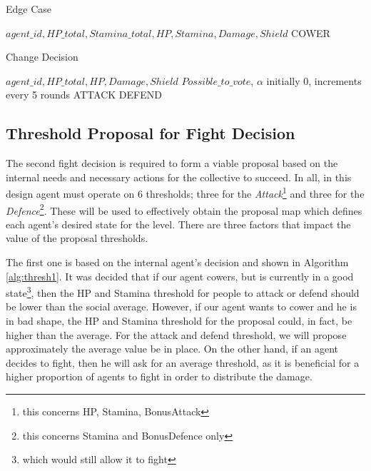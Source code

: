 \begin{algorithm}[htb]
\caption{Edge Case}\label{alg:9}
\begin{algorithmic} 
\scriptsize
\Require $agent\_id, HP\_total,Stamina\_total, HP, Stamina, Damage, Shield$
\Return COWER
\EndIf
\end{algorithmic}
\end{algorithm}

\begin{algorithm}[htb]
\caption{Change Decision}\label{alg:10}
\begin{algorithmic} 
\scriptsize
\Require $agent\_id, HP\_total, HP, Damage, Shield$
\Ensure $Possible\_to\_vote$, $\alpha$ initially 0, increments every 5 rounds
\Return ATTACK
\Return DEFEND
\EndIf
\EndIf
\EndIf
\end{algorithmic}
\end{algorithm}


\subsection{Threshold Proposal for Fight Decision}
    
The second fight decision is required to form a viable proposal based on the internal needs and necessary actions for the collective to succeed. In all, in this design agent must operate on 6 thresholds; three for the \textit{Attack}\footnote{this concerns HP, Stamina, BonusAttack} and three for the \textit{Defence}\footnote{this concerns Stamina and BonusDefence only}. These will be used to effectively obtain the proposal map which defines each agent's desired state for the level. There are three factors that impact the value of the proposal thresholds.
    
The first one is based on the internal agent's decision and shown in Algorithm \ref{alg:thresh1}. It was decided that if our agent cowers, but is currently in a good state\footnote{which would still allow it to fight}, then the HP and Stamina threshold for people to attack or defend should be lower than the social average. However, if our agent wants to cower and he is in bad shape, the HP and Stamina threshold for the proposal could, in fact, be higher than the average. For the attack and defend threshold, we will propose approximately the average value be in place. On the other hand, if an agent decides to fight, then he will ask for an average threshold, as it is beneficial for a higher proportion of agents to fight in order to distribute the damage.
 


